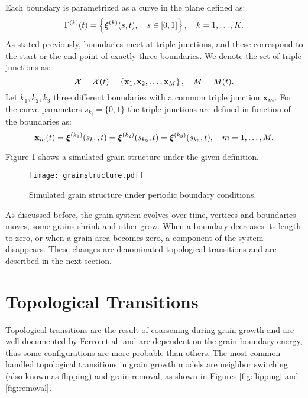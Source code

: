 Each boundary is parametrized as a curve in the plane defined as:
\begin{equation}
    \Gamma^{(k)}(t) = \left\{ \bm{\xi}^{(k)}(s,t), \quad s \in [0, 1] \right\},\quad k = 1, \dotsc, K.
    \label{eq:grainboundary}
\end{equation}
As stated previously, boundaries meet at triple junctions, and these correspond to the start or the end point of exactly three boundaries. We denote the set of triple junctions as:
\begin{equation}
    \vertices = \vertices(t) = \left\{ \x_1, \x_2, \dotsc, \x_M \right\},\quad M = M(t).
\end{equation}
Let $k_1, k_2, k_3$ three different boundaries with a common triple junction $\x_m$. For the curve parameters $s_{k_i} = \{0,1\}$ the triple junctions are defined in function of the boundaries as:
\begin{equation*}
    \x_{m}(t) =  \vxi^{(k_1)} (s_{k_1},t) = \vxi^{(k_2)} (s_{k_2},t) = \vxi^{(k_3)} (s_{k_3},t),\quad m =1,\dotsc,M.
\end{equation*}

Figure \ref{fig:grainstructure} shows a simulated grain structure under the given definition.
\begin{figure}[t]
    \centering
    \texttt{[image: grainstructure.pdf]}
    \caption{Simulated grain structure under periodic boundary conditions.}
    \label{fig:grainstructure}
\end{figure}
As discussed before, the grain system evolves over time, vertices and boundaries moves, some grains shrink and other grow. When a boundary decreases its length to zero, or when a grain area becomes zero, a component of the system disappears. These changes are denominated topological transitions and are described in the next section.

\section{Topological Transitions}

Topological transitions are the result of coarsening during grain growth and are well documented by Ferro et al. \cite{ferro1997elimination} and are dependent on the grain boundary energy, thus some configurations are more probable than others. The most common handled topological transitions \cite{kinderlehrermultiscale, Kinderlehrer2006, torres2015, van2016curvature} in grain growth models are neighbor switching (also known as flipping) and grain removal, as shown in Figures \ref{fig:flipping} and \ref{fig:removal}.

